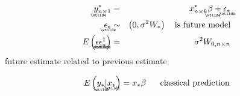 \documentclass{article}
\begin{document}
\begin{eqnarray*}
\underaccent{\wtilde}{y}%
_{n\times 1}^{\ast } &=&x_{n\times k}^{\ast }%
\underaccent{\wtilde}{\beta}%
+%
\underaccent{\wtilde}{\epsilon}%
_{\ast } \\
\underaccent{\wtilde}{\epsilon}%
_{\ast } &\sim &\left( 0,\sigma ^{2}W_{\ast }\right) \text{ is future model}
\\
E\left( 
\underaccent{\wtilde}{\epsilon}%
\underaccent{\wtilde}{\epsilon}%
_{\ast }^{\dagger }\right) &=&\sigma ^{2}W_{0,n\times n}
\end{eqnarray*}%
future estimate related to previous estimate

\begin{equation*}
E\left( 
\underaccent{\wtilde}{y}%
_{\ast }|%
\underaccent{\wtilde}{x}%
_{\ast }\right) =x_{\ast }\beta \text{\quad classical prediction}
\end{equation*}

\bigskip
\end{document}

